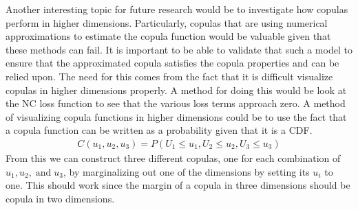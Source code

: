 Another interesting topic for future research would be to investigate how copulas perform in higher dimensions. Particularly, copulas that are using numerical approximations to estimate the copula function would be valuable given that these methods can fail. It is important to be able to validate that such a model to ensure that the approximated copula satisfies the copula properties and can be relied upon. The need for this comes from the fact that it is difficult visualize copulas in higher dimensions properly. A method for doing this would be look at the \gls{NC} loss function to see that the various loss terms approach zero. A method of visualizing copula functions in higher dimensions could be to use the fact that a copula function can be written as a probability given that it is a \gls{CDF}. 
\begin{align*}
    C(u_1, u_2, u_3) = P\left( U_1 \leq u_1, U_2 \leq u_2, U_3 \leq u_3 \right) 
\end{align*}
From this we can construct three different copulas, one for each combination of $u_1, u_2,\; \mathrm{and} \; u_3$, by marginalizing out one of the dimensions by setting its $u_i$ to one. This should work since the margin of a copula in three dimensions should be copula in two dimensions. 








